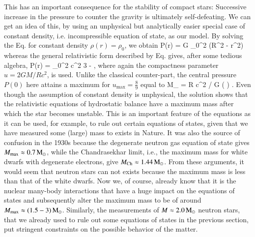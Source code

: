 This has an important consequence for the stability of compact stars:
Successive increase in the pressure to counter the gravity is ultimately self-defeating.
We can get an idea of this, by using an unphysical but analytically easier special case of constant density, i.e. incompressible equation of state, as our model.
By solving the Eq. for constant density $\rho(r) = \rho_0$, we obtain
\be
P(r) = G  \rho_0^2 (R^2 - r^2)
\ee
whereas the general relativistic form described by Eq. gives, after some tedious algebra,
\be
P(r) = \rho_0^2 c^2  
                          { 3 -  },
\ee
where again the compactness parameter $u = 2GM/Rc^2$, is used.
Unlike the classical counter-part, the central pressure $P(0)$ here attains a maximum for $u_{\mathrm{max}}=\frac{8}{9}$ equal to 
\be
M_{} =  R c^2 / G  \left(  \right) \Msun.
\ee
Even though the assumption of constant density is unphysical, the solution shows that the relativistic equations of hydrostatic balance have a maximum mass after which the star becomes unstable.
This is an important feature of the equations as it can be used, for example, to rule out certain equations of states, given that we have measured some (large) mass to exists in Nature.
It was also the source of confusion in the 1930s because the degenerate neutron gas equation of state gives $M_{\mathrm{max}} \approx 0.7 \, \mathrm{M}_{\odot}$, while the Chandrasekhar limit, i.e., the maximum mass for white dwarfs with degenerate electrons, give $M_{\mathrm{Ch}} \approx 1.44 \, \mathrm{M}_{\odot}$.
From these arguments, it would seem that neutron stars can not exists because the maximum mass is less than that of the white dwarfs.
Now we, of course, already know that it is the nuclear many-body interactions that have a huge impact on the equations of states and subsequently alter the maximum mass to be of around $M_{\mathrm{max}} \approx (1.5-3) \, \mathrm{M}_{\odot}$.
Similarly, the measurements of $M \approx 2.0\, \mathrm{M}_{\odot}$ neutron stars, that we already used to rule out some equations of states in the previous section, put stringent constraints on the possible behavior of the matter.



